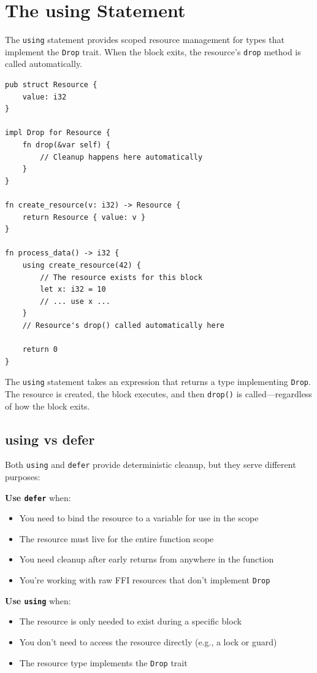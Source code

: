 \section{The using Statement}
\label{sec:using}

The \texttt{using} statement provides scoped resource management for types that implement the \texttt{Drop} trait. When the block exits, the resource's \texttt{drop} method is called automatically.

\begin{lstlisting}
pub struct Resource {
    value: i32
}

impl Drop for Resource {
    fn drop(&var self) {
        // Cleanup happens here automatically
    }
}

fn create_resource(v: i32) -> Resource {
    return Resource { value: v }
}

fn process_data() -> i32 {
    using create_resource(42) {
        // The resource exists for this block
        let x: i32 = 10
        // ... use x ...
    }
    // Resource's drop() called automatically here

    return 0
}
\end{lstlisting}

The \texttt{using} statement takes an expression that returns a type implementing \texttt{Drop}. The resource is created, the block executes, and then \texttt{drop()} is called---regardless of how the block exits.

\subsection{using vs defer}
\label{subsec:using-vs-defer}

Both \texttt{using} and \texttt{defer} provide deterministic cleanup, but they serve different purposes:

\textbf{Use \texttt{defer}} when:
\begin{itemize}
    \item You need to bind the resource to a variable for use in the scope
    \item The resource must live for the entire function scope
    \item You need cleanup after early returns from anywhere in the function
    \item You're working with raw FFI resources that don't implement \texttt{Drop}
\end{itemize}

\textbf{Use \texttt{using}} when:
\begin{itemize}
    \item The resource is only needed to exist during a specific block
    \item You don't need to access the resource directly (e.g., a lock or guard)
    \item The resource type implements the \texttt{Drop} trait
\end{itemize}

